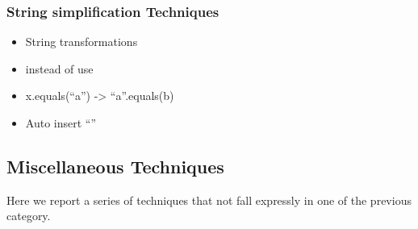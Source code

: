 \subsubsection{String simplification Techniques}
\begin{itemize}
  \item String transformations
  \item instead of  use 
  \item x.equals(“a”) -> “a”.equals(b)
  \item Auto insert “”
\end{itemize}

\subsection{Miscellaneous Techniques}

Here we report a series of techniques that not fall expressly in one of the
previous category.

